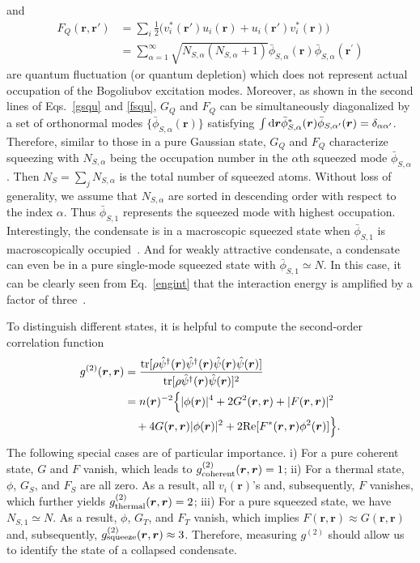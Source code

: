 \documentclass[pra,twocolumn,preprintnumbers,superscriptaddress,longbibliography,showkeys]{revtex4-1}
\begin{document}
and
\begin{align}
F_Q({\bm r}, {\bm r}') &= \sum_{i} \frac{1}{2} \Big( v^{\ast}_{i}({\bm r}') u_{i}({\bm r}) + u_{i}({\bm r}') v^{\ast}_{i}({\bm r}) \Big)\nonumber\\
&={\sum_{\alpha=1}^{\infty }\sqrt{N_{S,\alpha}(N_{S,\alpha}+1)}\bar{\phi}_{S,\alpha}({\bm r})\bar{\phi}_{S,\alpha}({\bm r}^{\prime })}\label{fsqu}
\end{align}
are quantum fluctuation (or quantum depletion) which does not represent actual occupation of the Bogoliubov excitation modes. Moreover, as shown in the second lines of Eqs.~\eqref{gsqu} and \eqref{fsqu}, $G_Q$ and $F_Q$ can be simultaneously diagonalized by a set of orthonormal modes $\{\bar\phi_{S,\alpha}({\bm r})\}$ satisfying $\int {\rm d}{\bm r}\bar{\phi}_{S,\alpha}^*({\bm r})\bar{\phi}_{S,\alpha'}({\bm r})=\delta_{\alpha\alpha'}$. Therefore, similar to those in a pure Gaussian state, $G_Q$ and $F_Q$ characterize squeezing with $N_{S,\alpha}$ being the occupation number in the $\alpha$th squeezed mode $\bar\phi_{S,\alpha}$. Then $N_S=\sum_jN_{S,\alpha}$ is the total number of squeezed atoms. Without loss of generality, we assume that $N_{S,\alpha}$ are sorted in descending order with respect to the index $\alpha$. Thus $\bar{\phi}_{S,1}$ represents the squeezed mode with highest occupation. Interestingly, the condensate is in a macroscopic squeezed state when $\bar{\phi}_{S,1}$ is macroscopically occupied~\cite{Shi2019,Wang2020,Pan2021}. And for weakly attractive condensate, a condensate can even be in a pure single-mode squeezed state with $\bar{\phi}_{S,1}\simeq N$. In this case, it can be clearly seen from Eq.~\eqref{engint} that the interaction energy is amplified by a factor of three~\cite{Shi2019}.

To distinguish different states, it is helpful to compute the second-order correlation function
\begin{align}
g^{(2)}({\bm r}, {\bm r}) &= \frac{{\rm tr}[\rho \hat{\psi}^{\dagger}({\bm r}) \hat{\psi}^{\dagger}({\bm r}) \hat{\psi}({\bm r}) \hat{\psi}({\bm r})]}{{\rm tr}[\rho \hat{\psi}^{\dagger}({\bm r}) \hat{\psi}({\bm r})]^2} \nonumber \\
&= n({\boldsymbol r})^{-2}\Big\{\vert \phi({\bm r}) \vert^{4} + 2 G^{2}({\bm r}, {\bm r}) + \vert F({\bm r}, {\bm r}) \vert^{2}\nonumber\\
&\quad + 4 G({\bm r}, {\bm r}) \vert \phi({\bm r}) \vert^{2}  + 2{\rm Re} [F^{*}({\bm r}, {\bm r}) \phi^{2}({\bm r})]\Big\}.
\end{align}
The following special cases are of particular importance. i) For a pure coherent state, $G$ and $F$ vanish, which leads to $g_{\rm coherent}^{(2)}({\bm r},{\bm r})=1$; ii) For a thermal state, $\phi$, $G_S$, and $F_S$ are all zero. As a result, all $v_i({\bm r})$'s and, subsequently, $F$ vanishes, which further yields $
g_{\rm thermal}^{(2)}({\bm r}, {\bm r}) = 2$; iii) For a pure squeezed state, we have $N_{S,1}\simeq N$. As a result, $\phi$, $G_T$, and $F_T$ vanish, which implies $F({\bm r}, {\bm r}) \approx G({\bm r}, {\bm r})$ and, subsequently, $g_{\rm squeeze}^{(2)}({\bm r}, {\bm r}) \approx 3$. Therefore, measuring $g^{(2)}$ should allow us to identify the state of a collapsed condensate.
\end{document}
